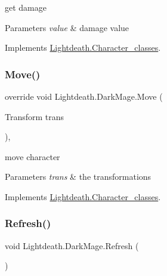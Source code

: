 get damage 


\begin{DoxyParams}{Parameters}
{\em value} & damage value\\
\hline
\end{DoxyParams}


Implements \hyperlink{class_lightdeath_1_1_character__classes_a8aca5dd3f39cca87f55ccd333d0dc2ab}{Lightdeath.\+Character\+\_\+classes}.

\hypertarget{class_lightdeath_1_1_dark_mage_a5a8c5658cc98b552aa1ae4f7445054d8}{}\label{class_lightdeath_1_1_dark_mage_a5a8c5658cc98b552aa1ae4f7445054d8} 
\subsubsection{\texorpdfstring{Move()}{Move()}}
{\footnotesize\ttfamily override void Lightdeath.\+Dark\+Mage.\+Move (\begin{DoxyParamCaption}\item[{Transform}]{trans }\end{DoxyParamCaption})\hspace{0.3cm}{\ttfamily [inline]}, {\ttfamily [virtual]}}



move character 


\begin{DoxyParams}{Parameters}
{\em trans} & the transformations\\
\hline
\end{DoxyParams}


Implements \hyperlink{class_lightdeath_1_1_character__classes_a9db6a2c0a9eaf35104b08fcad94f98d4}{Lightdeath.\+Character\+\_\+classes}.

\hypertarget{class_lightdeath_1_1_dark_mage_ae7d471554a94d2bda754a9098ed3423e}{}\label{class_lightdeath_1_1_dark_mage_ae7d471554a94d2bda754a9098ed3423e} 
\subsubsection{\texorpdfstring{Refresh()}{Refresh()}}
{\footnotesize\ttfamily void Lightdeath.\+Dark\+Mage.\+Refresh (\begin{DoxyParamCaption}{ }\end{DoxyParamCaption})\hspace{0.3cm}{\ttfamily [inline]}}



